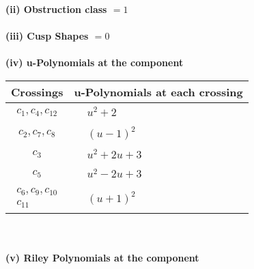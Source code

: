 \documentclass[1p]{elsarticle_modified}
\theoremstyle{definition}
\begin{document}
\flushleft \textbf{(ii) Obstruction class $= 1$}\\~\\
\flushleft \textbf{(iii) Cusp Shapes $= 0$}\\~\\
\newpage\renewcommand{\arraystretch}{1}
\flushleft \textbf{(iv) u-Polynomials at the component}\newline \\
\begin{tabular}{m{50pt}|m{274pt}}
Crossings & \hspace{64pt}u-Polynomials at each crossing \\
\hline $$\begin{aligned}c_{1},c_{4},c_{12}\end{aligned}$$&$\begin{aligned}
&u^2+2
\end{aligned}$\\
\hline $$\begin{aligned}c_{2},c_{7},c_{8}\end{aligned}$$&$\begin{aligned}
&(u-1)^2
\end{aligned}$\\
\hline $$\begin{aligned}c_{3}\end{aligned}$$&$\begin{aligned}
&u^2+2 u+3
\end{aligned}$\\
\hline $$\begin{aligned}c_{5}\end{aligned}$$&$\begin{aligned}
&u^2-2 u+3
\end{aligned}$\\
\hline $$\begin{aligned}c_{6},c_{9},c_{10}\\c_{11}\end{aligned}$$&$\begin{aligned}
&(u+1)^2
\end{aligned}$\\
\hline
\end{tabular}\\~\\
\newpage\renewcommand{\arraystretch}{1}
\flushleft \textbf{(v) Riley Polynomials at the component}\newline \\
\end{document}
